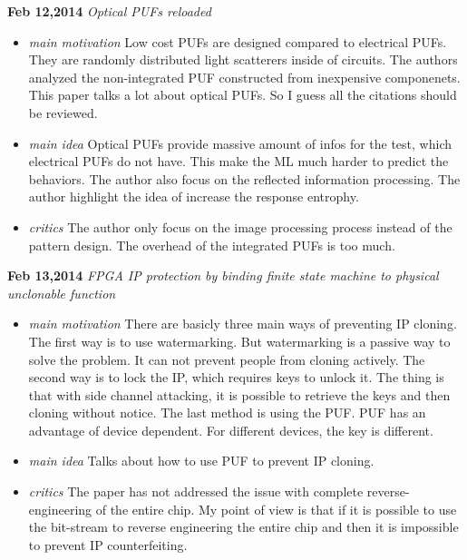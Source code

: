 \documentclass[]{article}
\begin{document}
\noindent \textbf{Feb 12,2014}
\textit{Optical PUFs reloaded}
\indent		\begin{itemize}
        \item \textit{main motivation}
            Low cost PUFs are designed compared to electrical PUFs. They are
            randomly distributed light scatterers inside of circuits. The
            authors analyzed the non-integrated PUF constructed from inexpensive
            componenets. This paper talks a lot about optical PUFs. So I guess
            all the citations should be reviewed.
          
        \item \textit{main idea}
            Optical PUFs provide massive amount of infos for the test, which
            electrical PUFs do not have. This make the ML much harder to predict
            the behaviors. The author also focus on the reflected information
            processing. The author highlight the idea of increase the response
            entrophy.

        \item \textit{critics}
            The author only focus on the image processing process instead of the
            pattern design. The overhead of the integrated PUFs is too much.
            
        \end{itemize}

\noindent \textbf{Feb 13,2014}
\textit{FPGA IP protection by binding finite state machine to physical
unclonable function}
\indent     \begin{itemize}
        \item \textit{main motivation} 
            There are basicly three main ways of preventing IP cloning. The
            first way is to use watermarking. But watermarking is a passive way
            to solve the problem. It can not prevent people from cloning
            actively. The second way is to lock the IP, which requires keys to
            unlock it. The thing is that with side channel attacking, it is
            possible to retrieve the keys and then cloning without notice. The
            last method is using the PUF. PUF has an advantage of device
            dependent. For different devices, the key is different.
        \item \textit{main idea} Talks about how to use PUF to prevent IP
            cloning. 
        \item \textit{critics} The paper has not addressed the issue with
            complete reverse-engineering of the entire chip. My point of view is
            that if it is possible to use the bit-stream to reverse engineering
            the entire chip and then it is impossible to prevent IP
            counterfeiting.
        \end{itemize}
\end{document}
